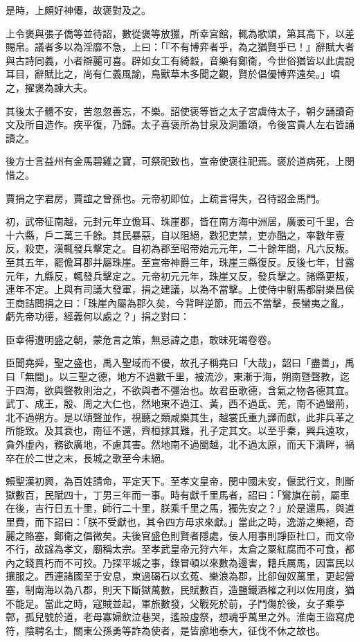 \begin{pinyinscope}
是時，上頗好神僊，故褒對及之。

上令褒與張子僑等並待詔，數從褒等放獵，所幸宮館，輒為歌頌，第其高下，以差賜帛。議者多以為淫靡不急，上曰：「『不有博弈者乎，為之猶賢乎已！』辭賦大者與古詩同義，小者辯麗可喜。辟如女工有綺縠，音樂有鄭衛，今世俗猶皆以此虞說耳目，辭賦比之，尚有仁義風諭，鳥獸草木多聞之觀，賢於倡優博弈遠矣。」頃之，擢褒為諫大夫。

其後太子體不安，苦忽忽善忘，不樂。詔使褒等皆之太子宮虞侍太子，朝夕誦讀奇文及所自造作。疾平復，乃歸。太子喜褒所為甘泉及洞簫頌，令後宮貴人左右皆誦讀之。

後方士言益州有金馬碧雞之寶，可祭祀致也，宣帝使褒往祀焉。褒於道病死，上閔惜之。

賈捐之字君房，賈誼之曾孫也。元帝初即位，上疏言得失，召待詔金馬門。

初，武帝征南越，元封元年立儋耳、珠崖郡，皆在南方海中洲居，廣袤可千里，合十六縣，戶二萬三千餘。其民暴惡，自以阻絕，數犯吏禁，吏亦酷之，率數年壹反，殺吏，漢輒發兵擊定之。自初為郡至昭帝始元元年，二十餘年間，凡六反叛。至其五年，罷儋耳郡并屬珠崖。至宣帝神爵三年，珠崖三縣復反。反後七年，甘露元年，九縣反，輒發兵擊定之。元帝初元元年，珠崖又反，發兵擊之。諸縣更叛，連年不定。上與有司議大發軍，捐之建議，以為不當擊。上使侍中駙馬都尉樂昌侯王商詰問捐之曰：「珠崖內屬為郡久矣，今背畔逆節，而云不當擊，長蠻夷之亂，虧先帝功德，經義何以處之？」捐之對曰：

臣幸得遭明盛之朝，蒙危言之策，無忌諱之患，敢昧死竭卷卷。

臣聞堯舜，聖之盛也，禹入聖域而不優，故孔子稱堯曰「大哉」，韶曰「盡善」，禹曰「無間」。以三聖之德，地方不過數千里，被流沙，東漸于海，朔南暨聲教，迄于四海，欲與聲教則治之，不欲與者不彊治也。故君臣歌德，含氣之物各德其宜。武丁、成王，殷、周之大仁也，然地東不過江、黃，西不過氐、羌，南不過蠻荊，北不過朔方。是以頌聲並作，視聽之類咸樂其生，越裳氏重九譯而獻，此非兵革之所能致。及其衰也，南征不還，齊桓捄其難，孔子定其文。以至乎秦，興兵遠攻，貪外虛內，務欲廣地，不慮其害。然地南不過閩越，北不過太原，而天下潰畔，禍卒在於二世之末，長城之歌至今未絕。

賴聖漢初興，為百姓請命，平定天下。至孝文皇帝，閔中國未安，偃武行文，則斷獄數百，民賦四十，丁男三年而一事。時有獻千里馬者，詔曰：「鸞旗在前，屬車在後，吉行日五十里，師行二十里，朕乘千里之馬，獨先安之？」於是還馬，與道里費，而下詔曰：「朕不受獻也，其令四方毋求來獻。」當此之時，逸游之樂絕，奇麗之賂塞，鄭衛之倡微矣。夫後官盛色則賢者隱處，佞人用事則諍臣杜口，而文帝不行，故諡為孝文，廟稱太宗。至孝武皇帝元狩六年，太倉之粟紅腐而不可食，都內之錢貫朽而不可挍。乃探平城之事，錄冒頓以來數為邊害，籍兵厲馬，因富民以攘服之。西連諸國至于安息，東過碣石以玄菟、樂浪為郡，比卻匈奴萬里，更起營塞，制南海以為八郡，則天下斷獄萬數，民賦數百，造鹽鐵酒榷之利以佐用度，猶不能足。當此之時，寇賊並起，軍旅數發，父戰死於前，子鬥傷於後，女子乘亭鄣，孤兒號於道，老母寡婦飲泣巷哭，遙設虛祭，想魂乎萬里之外。淮南王盜寫虎符，陰聘名士，關東公孫勇等詐為使者，是皆廓地泰大，征伐不休之故也。


\end{pinyinscope}
